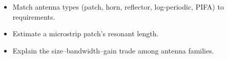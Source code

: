\begin{objectives}
\begin{itemize}[leftmargin=1.4em,itemsep=2pt]
\item Match antenna types (patch, horn, reflector, log-periodic, PIFA) to requirements.
\item Estimate a microstrip patch's resonant length.
\item Explain the size--bandwidth--gain trade among antenna families.
\end{itemize}
\end{objectives}
